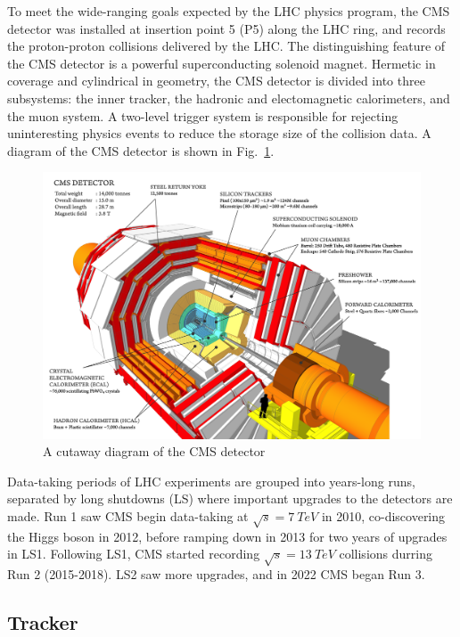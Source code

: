 

To meet the wide-ranging goals expected by the LHC physics program, the CMS detector \cite{CMSTDR} was installed at insertion point 5 (P5) along the LHC ring, and records the proton-proton collisions delivered by the LHC. The distinguishing feature of the CMS detector is a powerful superconducting solenoid magnet. Hermetic in coverage and cylindrical in geometry, the CMS detector is divided into three subsystems: the inner tracker, the hadronic and electomagnetic calorimeters, and the muon system. A two-level trigger system is responsible for rejecting uninteresting physics events to reduce the storage size of the collision data. A diagram of the CMS detector is shown in Fig.~\ref{fig:CMSDiagram}.

\begin{figure}[H]
    \centering
    \includegraphics[width=1\textwidth]{Images/CMS/CMSDiagram.png}
    \caption{A cutaway diagram of the CMS detector}
    \label{fig:CMSDiagram}
\end{figure}

Data-taking periods of LHC experiments are grouped into years-long runs, separated by long shutdowns (LS) where important upgrades to the detectors are made. Run 1 saw CMS begin data-taking at $\sqrt{s}=\SI{7}{TeV}$ in 2010, co-discovering the Higgs boson in 2012, before ramping down in 2013 for two years of upgrades in LS1. Following LS1, CMS started recording $\sqrt{s}=\SI{13}{TeV}$ collisions durring Run 2 (2015-2018). LS2 saw more upgrades, and in 2022 CMS began Run 3.


\subsection{Tracker} \label{sec:InnerTracker}


